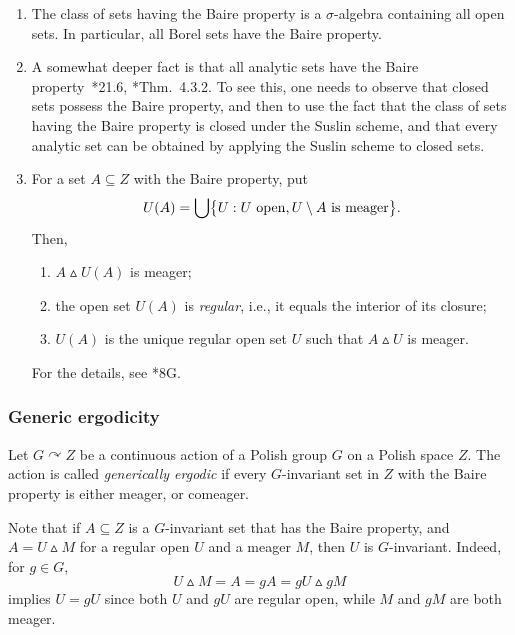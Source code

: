 \documentclass[12pt]{paper}
\numberwithin{equation}{section}
\theoremstyle{plain}
\theoremstyle{definition}
\newcommand{\acts}{\curvearrowright}
\newcommand{\symd}{\vartriangle}
\begin{document}
\begin{enumerate}[leftmargin=.6cm, label={\sf \arabic*}., ref={\sf \arabic*}]
\item The class of sets having the Baire property is a \(\sigma\)-algebra containing all open
  sets. In particular, all Borel sets have the Baire property.
\item A somewhat deeper fact is that all analytic sets have the Baire
  property~\cite{Kechris}*{21.6}, \cite{MR1619545}*{Thm.~4.3.2}.  To see this, one needs to observe
  that closed sets possess the Baire property, and then to use the fact that the class of sets
  having the Baire property is closed under the Suslin scheme, and that every analytic set can be
  obtained by applying the Suslin scheme to closed sets.


\item For a set \(A\subseteq Z\) with the Baire property, put
  \[
    U(A) = \bigcup \bigl\{U:U\ {\rm open}, U\setminus A\ {\rm is\ meager} \bigr\}.
  \]
  Then,
  \begin{enumerate}[leftmargin=.8cm]
  \item[{\sf (a)}] \(A \symd U(A)\) is meager;
  \item[{\sf (b)}] the open set \(U(A)\) is \emph{regular}, i.e., it equals the interior of its
    closure;
  \item[{\sf (c)}] \(U(A)\) is the unique regular open set \(U\) such that \(A\symd U\) is meager.
  \end{enumerate}
  For the details, see \cite{Kechris}*{8G}.
\end{enumerate}

\subsubsection{Generic ergodicity}
Let \(G \acts Z\) be a continuous action of a Polish group \(G\) on a Polish space \(Z\).  The
action is called \emph{generically ergodic} if every \(G\)-invariant set in \(Z\) with the Baire
property is either meager, or comeager.

Note that if \(A \subseteq Z\) is a \(G\)-invariant set that has the Baire property, and
\(A = U \symd M\) for a regular open \(U\) and a meager \(M\), then \(U\) is \(G\)-invariant.
Indeed, for \(g\in G\),
\[
  U \symd M = A = gA = gU \symd gM
\]
implies \(U=gU\) since both \(U\) and \(gU\) are regular open, while \(M\) and \(gM\) are both
meager.
\end{document}

